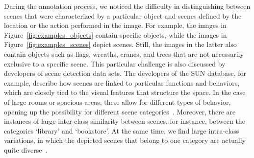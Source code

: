 \documentclass[a4paper,twoside]{article}
\begin{document}
During the annotation process, we noticed the difficulty in distinguishing between scenes that were characterized by a particular object and scenes defined by the location or the action performed in the image.
For example, the images in Figure~\ref{fig:examples_objects} contain specific objects, while the images in Figure~\ref{fig:examples_scenes} depict scenes.
Still, the images in the latter also contain objects such as flags, wreaths, cranes, and trees that are not necessarily exclusive to a specific scene.
This particular challenge is also discussed by developers of scene detection data sets.
The developers of the SUN database, for example, describe how scenes are linked to particular functions and behaviors, which are closely tied to the visual features that structure the space.
In the case of large rooms or spacious areas, these allow for different types of behavior, opening up the possibility for different scene categories~\cite{xiao2010sun}. 
Moreover, there are instances of large inter-class similarity between scenes, for instance, between the categories `library' and `bookstore'.
At the same time, we find large intra-class variations, in which the depicted scenes that belong to one category are actually quite diverse~\cite{xie_scene_2020}.
\end{document}
